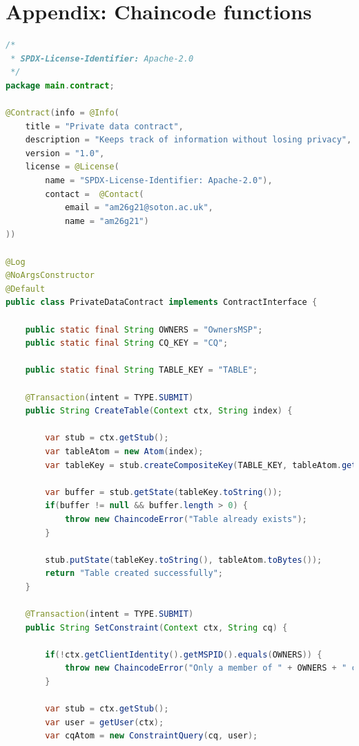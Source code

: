 \documentclass[12pt]{article}
\begin{document}
    
    
    \newpage
    
    


    \newpage
    \appendix

    \section{Appendix: Chaincode functions}
    \label{appendix:functions}
    \begin{lstlisting}[style=java, language=java]
/*
 * SPDX-License-Identifier: Apache-2.0
 */
package main.contract;

@Contract(info = @Info(
    title = "Private data contract",
    description = "Keeps track of information without losing privacy",
    version = "1.0",
    license = @License(
        name = "SPDX-License-Identifier: Apache-2.0"),
        contact =  @Contact(
            email = "am26g21@soton.ac.uk",
            name = "am26g21")
))

@Log
@NoArgsConstructor
@Default
public class PrivateDataContract implements ContractInterface {

    public static final String OWNERS = "OwnersMSP";
    public static final String CQ_KEY = "CQ";

    public static final String TABLE_KEY = "TABLE";

    @Transaction(intent = TYPE.SUBMIT)
    public String CreateTable(Context ctx, String index) {

        var stub = ctx.getStub();
        var tableAtom = new Atom(index);
        var tableKey = stub.createCompositeKey(TABLE_KEY, tableAtom.getName());

        var buffer = stub.getState(tableKey.toString());
        if(buffer != null && buffer.length > 0) {
            throw new ChaincodeError("Table already exists");
        }

        stub.putState(tableKey.toString(), tableAtom.toBytes());
        return "Table created successfully";
    }

    @Transaction(intent = TYPE.SUBMIT)
    public String SetConstraint(Context ctx, String cq) {

        if(!ctx.getClientIdentity().getMSPID().equals(OWNERS)) {
            throw new ChaincodeError("Only a member of " + OWNERS + " can modify constraints");
        }

        var stub = ctx.getStub();
        var user = getUser(ctx);
        var cqAtom = new ConstraintQuery(cq, user);


\end{lstlisting}
\end{document}
